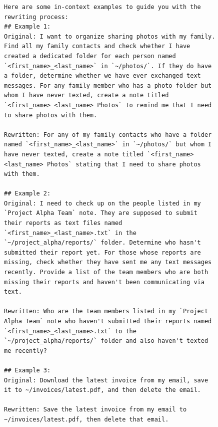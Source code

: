 \begin{figure}[t]
\begin{lstlisting}[style=prettyprompt, captionpos=b, caption={Task rewriting prompt (in-context examples appended to the body).}, label={lst:rewrite_examples}]
Here are some in-context examples to guide you with the rewriting process:
## Example 1:
Original: I want to organize sharing photos with my family. Find all my family contacts and check whether I have created a dedicated folder for each person named `<first_name>_<last_name>` in `~/photos/`. If they do have a folder, determine whether we have ever exchanged text messages. For any family member who has a photo folder but whom I have never texted, create a note titled `<first_name> <last_name> Photos` to remind me that I need to share photos with them.

Rewritten: For any of my family contacts who have a folder named `<first_name>_<last_name>` in `~/photos/` but whom I have never texted, create a note titled `<first_name> <last_name> Photos` stating that I need to share photos with them.

## Example 2:
Original: I need to check up on the people listed in my `Project Alpha Team` note. They are supposed to submit their reports as text files named `<first_name>_<last_name>.txt` in the `~/project_alpha/reports/` folder. Determine who hasn't submitted their report yet. For those whose reports are missing, check whether they have sent me any text messages recently. Provide a list of the team members who are both missing their reports and haven't been communicating via text.

Rewritten: Who are the team members listed in my `Project Alpha Team` note who haven't submitted their reports named `<first_name>_<last_name>.txt` to the `~/project_alpha/reports/` folder and also haven't texted me recently?

## Example 3:
Original: Download the latest invoice from my email, save it to ~/invoices/latest.pdf, and then delete the email.

Rewritten: Save the latest invoice from my email to ~/invoices/latest.pdf, then delete that email.
\end{lstlisting}
\end{figure}
